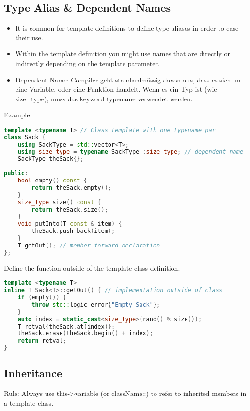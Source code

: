 \subsection{Type Alias \& Dependent Names}
\begin{itemize}
  \itemsep -0.5em 
  \item It is common for template definitions to define type aliases in order to ease their use.
  \item Within the template definition you might use names that are directly or indirectly depending on the template parameter.
  \item Dependent Name: Compiler geht standardmässig davon aus, dass es sich im eine Variable, oder eine Funktion handelt. Wenn es ein Typ ist (wie size\_type), muss das keyword typename verwendet werden.
\end{itemize}

Example
\begin{lstlisting}[language=C++]
template <typename T> // Class template with one typename par
class Sack {
	using SackType = std::vector<T>;
	using size_type = typename SackType::size_type; // dependent name
	SackType theSack{};
	
public:
	bool empty() const {
		return theSack.empty();
	}
	size_type size() const {
		return theSack.size();
	}
	void putInto(T const & item) {
		theSack.push_back(item);
	}
	T getOut(); // member forward declaration
};
\end{lstlisting}
Define the function outside of the template class definition.
\begin{lstlisting}[language=C++]
template <typename T> 
inline T Sack<T>::getOut() { // implementation outside of class
	if (empty()) {
		throw std::logic_error{"Empty Sack"}; 
	} 
	auto index = static_cast<size_type>(rand() % size()); 
	T retval{theSack.at(index)};
	theSack.erase(theSack.begin() + index);
	return retval;
}
\end{lstlisting}

\subsection{Inheritance}
Rule: Always use this->variable (or className::) to refer to inherited members in a template class.

